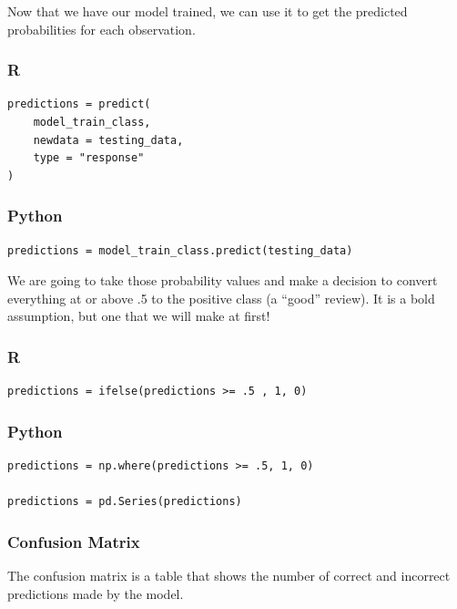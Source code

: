 \documentclass[
  letterpaper,
]{krantz}
\begin{document}
Now that we have our model trained, we can use it to get the predicted
probabilities for each observation.

\subsubsection{R}

\begin{verbatim}
predictions = predict(
    model_train_class,
    newdata = testing_data,
    type = "response"
)
\end{verbatim}

\subsubsection{Python}

\begin{verbatim}
predictions = model_train_class.predict(testing_data)
\end{verbatim}

We are going to take those probability values and make a decision to
convert everything at or above .5 to the positive class (a ``good''
review). It is a bold assumption, but one that we will make at first!

\subsubsection{R}

\begin{verbatim}
predictions = ifelse(predictions >= .5 , 1, 0)
\end{verbatim}

\subsubsection{Python}

\begin{verbatim}
predictions = np.where(predictions >= .5, 1, 0)

predictions = pd.Series(predictions)
\end{verbatim}

\subsubsection{Confusion Matrix}\label{sec-knowing-metrics-confusion}

The confusion matrix is a table that shows the number of correct and
incorrect predictions made by the model.
\end{document}
